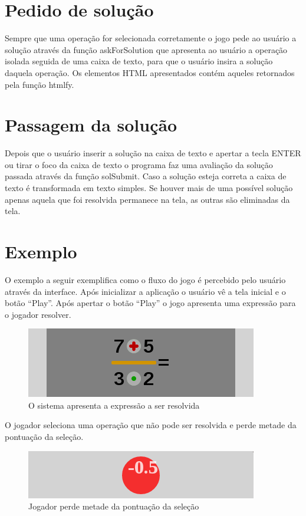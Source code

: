 \section{Pedido de solução}
Sempre que uma operação for selecionada corretamente o jogo pede ao usuário a solução através da função askForSolution que apresenta ao usuário a operação isolada seguida de uma caixa de texto, para que o usuário insira a solução daquela operação. Os elementos HTML apresentados contém aqueles retornados pela função htmlfy.

\section{Passagem da solução}
Depois que o usuário inserir a solução na caixa de texto e apertar a tecla ENTER ou tirar o foco da caixa de texto o programa faz uma avaliação da solução passada através da função solSubmit. Caso a solução esteja correta a caixa de texto é transformada em texto simples. Se houver mais de uma possível solução apenas aquela que foi resolvida permanece na tela, as outras são eliminadas da tela.

\section{Exemplo}
O exemplo a seguir exemplifica como o fluxo do jogo é percebido pelo usuário através da interface. Após inicializar a aplicação o usuário vê a tela inicial e o botão “Play”. Após apertar o botão “Play” o jogo apresenta uma expressão para o jogador resolver.

\begin{figure}[H]
	\caption{\label{xp_1} O sistema apresenta a expressão a ser resolvida}
	\begin{center}
	    \includegraphics[scale=1]{xp_4_1.png}
	\end{center}
\end{figure}

O jogador seleciona uma operação que não pode ser resolvida e perde metade da pontuação da seleção.

\begin{figure}[H]
	\caption{\label{miss_0_5_1}Jogador perde metade da pontuação da seleção}
	\begin{center}
	    \includegraphics[scale=1]{miss_0_5.png}
	\end{center}
\end{figure}

